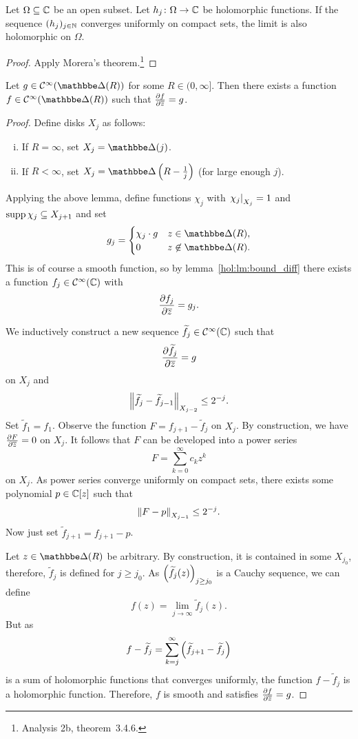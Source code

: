 \begin{lema}
Let $\Omega \subseteq \mathbb{C}$ be an open subset. Let
$h_j \colon \Omega \to \mathbb{C}$ be holomorphic functions. If the
sequence $(h_j)_{j \in \mathbb{N}}$ converges uniformly on compact sets,
the limit is also holomorphic on $\Omega$.
\end{lema}

\begin{proof}
Apply Morera's theorem.\footnote{Analysis 2b, theorem~3.4.6.}
\end{proof}

\begin{izrek}
Let $g \in \mathcal{C}^\infty(\dsk(R))$ for some
$R \in (0, \infty]$. Then there exists a function
$f \in \mathcal{C}^\infty(\dsk(R))$ such that
$\frac{\partial f}{\partial \overline{z}} = g$.
\end{izrek}

\begin{proof}
Define disks $X_j$ as follows:

\begin{enumerate}[i)]
\item If $R = \infty$, set $X_j = \dsk(j)$.
\item If $R < \infty$, set $X_j = \dsk \br{R - \frac{1}{j}}$ (for
large enough $j$).
\end{enumerate}

Applying the above lemma, define functions $\chi_j$ with
$\left. \chi_j\right|_{X_j}^{} = 1$ and $\operatorname{supp} \chi_j \subseteq X_{j+1}$ and
set
\[
g_j =
\begin{cases}
\chi_j \cdot g & z \in \dsk(R), \\
       0       & z \not \in \dsk(R).
\end{cases}
\]
This is of course a smooth function, so by
lemma~\ref{hol:lm:bound_diff} there exists a function
$f_j \in \mathcal{C}^\infty(\mathbb{C})$ with
\[
\frac{\partial f_j}{\partial \overline{z}} = g_j.
\]

We inductively construct a new sequence
$\widetilde{f}_j \in \mathcal{C}^\infty(\mathbb{C})$ such that
\[
\frac{\partial \widetilde{f}_j}{\partial \overline{z}} = g
\]
on $X_j$ and
\[
\left\lVert \widetilde{f}_j - \widetilde{f}_{j-1}\right\rVert_{X_{j-2}} \leq 2^{-j}.
\]
Set $\widetilde{f}_1 = f_1$. Observe the function
$F = f_{j+1} - \widetilde{f}_j$ on $X_j$. By construction, we have
$\frac{\partial F}{\partial \overline{z}} = 0$ on $X_j$. It follows that $F$ can be
developed into a power series
\[
F = \sum_{k=0}^\infty c_k z^k
\]
on $X_j$. As power series converge uniformly on compact sets, there
exists some polynomial $p \in \mathbb{C}[z]$ such that
\[
\left\lVert F - p\right\rVert_{X_{j-1}} \leq 2^{-j}.
\]
Now just set $\widetilde{f}_{j+1} = f_{j+1} - p$.

Let $z \in \dsk(R)$ be arbitrary. By construction, it is contained
in some $X_{j_0}$, therefore, $\widetilde{f}_j$ is defined for
$j \geq j_0$. As $\left(\widetilde{f}_j(z)\right)_{j \geq j_0}$ is a
Cauchy sequence, we can define
\[
f(z) = \lim_{j \to \infty} \widetilde{f}_j(z).
\]
But as
\[
f - \widetilde{f}_j =
\sum_{k=j}^\infty \left(\widetilde{f}_{j+1} - \widetilde{f}_j\right)
\]
is a sum of holomorphic functions that converges uniformly, the
function $f - \widetilde{f}_j$ is a holomorphic function.
Therefore, $f$ is smooth and satisfies $\frac{\partial f}{\partial \overline{z}} = g$.
\end{proof}

